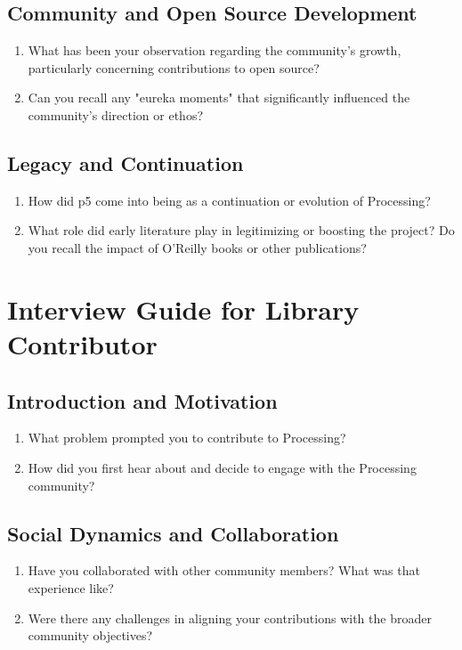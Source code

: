 \subsection*{Community and Open Source Development}

\begin{enumerate}[resume]
    \item What has been your observation regarding the community's growth, particularly concerning contributions to open source?
    \item Can you recall any "eureka moments" that significantly influenced the community's direction or ethos?
\end{enumerate}

\subsection*{Legacy and Continuation}

\begin{enumerate}[resume]
    \item How did p5 come into being as a continuation or evolution of Processing?
    \item What role did early literature play in legitimizing or boosting the project? Do you recall the impact of O'Reilly books or other publications?
\end{enumerate}

\section*{Interview Guide for Library Contributor}

\subsection*{Introduction and Motivation}

\begin{enumerate}
    \item What problem prompted you to contribute to Processing?
    \item How did you first hear about and decide to engage with the Processing community?
\end{enumerate}

\subsection*{Social Dynamics and Collaboration}

\begin{enumerate}[resume]
    \item Have you collaborated with other community members? What was that experience like?
    \item Were there any challenges in aligning your contributions with the broader community objectives?
\end{enumerate}